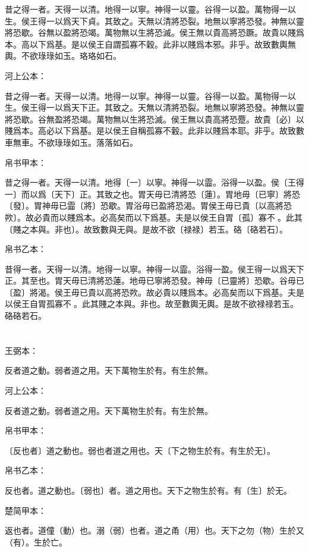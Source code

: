 \documentclass[a5paper]{ctexbook}
\begin{document}
    昔之得一者。天得一以清。地得一以寧。神得一以靈。谷得一以盈。萬物得一以生。侯王得一以爲天下貞。其致之。天無以清將恐裂。地無以寧將恐發。神無以靈將恐歇。谷無以盈將恐竭。萬物無以生將恐滅。侯王無以貴高將恐蹶。故貴以賤爲本。高以下爲基。是以侯王自謂孤寡不穀。此非以賤爲本邪。非乎。故致數輿無輿。不欲琭琭如玉。珞珞如石。

    河上公本：

    昔之得一者。天得一以清。地得一以寧。神得一以靈。谷得一以盈。萬物得一以生。侯王得一以爲天下正。其致之。天無以清將恐裂。地無以寧將恐發。神無以靈將恐歇。谷無盈將恐竭。萬物無以生將恐滅。侯王無以貴高將恐蹷。故貴〔必〕以賤爲本。高必以下爲基。是以侯王自稱孤寡不轂。此非以賤爲本耶。非乎。故致數車無車。不欲琭琭如玉。落落如石。

    帛书甲本：

    昔之得一者。天得一以清。地得〔一〕以寧。神得一以霝。浴得一以盈。侯〔王得一〕而以爲〔天下〕正。其致之也。胃天毋已清將恐〔蓮〕。胃地毋〔已寧〕將恐〔發〕。胃神毋已霝〔將〕恐歇。胃浴毋已盈將恐渴。胃侯王毋已貴〔以高將恐欮〕。故必貴而以賤爲本。必高矣而以下爲基。夫是以侯王自胃〔孤〕寡不𥞤。此其〔賤之本與。非也〕。故致數與无與。是故不欲〔禄禄〕若玉。硌〔硌若石〕。

    帛书乙本：

    昔得一者。天得一以清。地得一以寧。神得一以霝。浴得一盈。侯王得一以爲天下正。其至也。胃天毋已清將恐蓮。地毋已寧將恐發。神毋〔已靈將〕恐歇。谷毋已〔盈〕將渴。侯王毋已貴以高將恐欮。故必貴以賤爲本。必高矣而以下爲基。夫是以侯王自胃孤寡不𥞤。此其賤之本與。非也。故至數輿无輿。是故不欲禄禄若玉。硌硌若石。

    \chapter{}
    王弼本：

    反者道之動。弱者道之用。天下萬物生於有。有生於無。

    河上公本：

    反者道之動。弱者道之用。天下萬物生於有。有生於無。

    帛书甲本：

    〔反也者〕道之動也。弱也者道之用也。天〔下之物生於有。有生於无〕。

    帛书乙本：

    反也者。道之動也。〔弱也〕者。道之用也。天下之物生於有。有〔生〕於无。

    楚简甲本：

    返也者。道僮（動）也。溺（弱）也者。道之甬（用）也。天下之勿（物）生於又（有）。生於亡。
\end{document}

